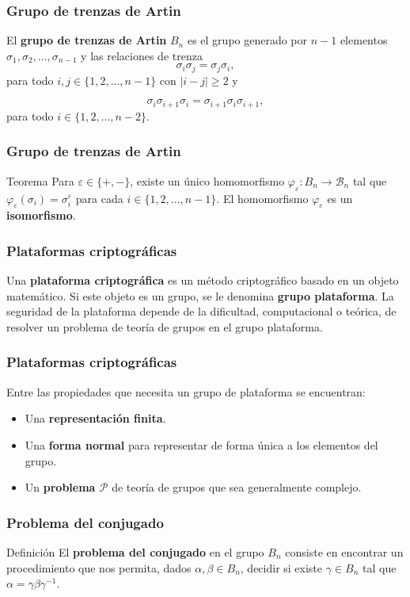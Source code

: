 \documentclass{beamer}
\begin{document}
\begin{frame}
\frametitle{Grupo de trenzas de Artin}

El \textbf{grupo de trenzas de Artin} $B_n$ es el grupo generado por $n-1$ elementos $\sigma_1, \sigma_2,...,\sigma_{n-1}$ y las relaciones de trenza
$$\sigma_i\sigma_j = \sigma_j\sigma_i,$$
para todo $i,j\in\{1,2,...,n-1\}$ con $|i-j|\geq 2$ y

$$\sigma_i\sigma_{i+1}\sigma_i =\sigma_{i+1}\sigma_i\sigma_{i+1},$$
para todo $i\in\{1,2,...,n-2\}$.

\end{frame}

\begin{frame}
\frametitle{Grupo de trenzas de Artin}

\begin{block}{Teorema}
Para $\varepsilon \in\{+,-\}$, existe un único homomorfismo $\varphi_\varepsilon : B_n\rightarrow\mathcal{B}_n$ tal que $\varphi_\varepsilon(\sigma_i) = \sigma_i^\varepsilon$ para cada $i\in\{1,2,...,n-1\}$. El homomorfismo $\varphi_\varepsilon$ es un \textbf{isomorfismo}.
\end{block}
\end{frame}


\begin{frame}
\frametitle{Plataformas criptográficas}

Una \textbf{plataforma criptográfica} es un método criptográfico basado en un  objeto matemático. Si este objeto es un grupo, se le denomina \textbf{grupo plataforma}. La seguridad de la plataforma depende de la dificultad, computacional o teórica, de resolver un problema de teoría de grupos en el grupo plataforma.
\end{frame}

\begin{frame}
\frametitle{Plataformas criptográficas}

Entre las propiedades que necesita un grupo de plataforma se encuentran:
\begin{itemize}
\item Una \textbf{representación finita}.
\item Una \textbf{forma normal} para representar de forma única a los elementos del grupo.
\item Un \textbf{problema $\mathcal{P}$} de teoría de grupos que sea generalmente complejo.
\end{itemize}
\end{frame}

\begin{frame}
\frametitle{Problema del conjugado}
\begin{block}{Definición}
El \textbf{problema del conjugado} en el grupo $B_n$ consiste en encontrar un procedimiento que nos permita, dados $\alpha,\beta\in B_n$, decidir si existe $\gamma\in B_n$ tal que $\alpha=\gamma\beta\gamma^{-1}$.
\end{block}
\end{frame}
\end{document}
